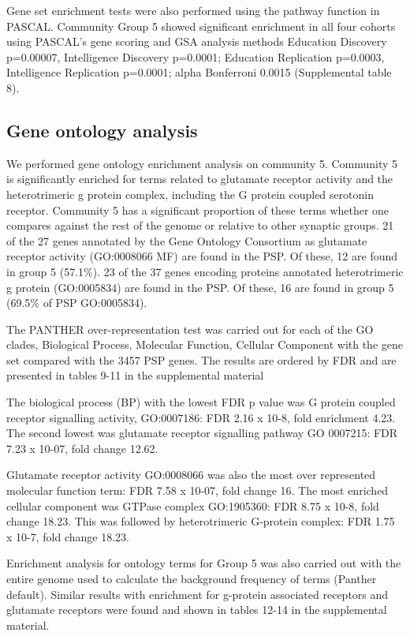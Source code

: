 Gene set enrichment tests were also performed using the pathway function in PASCAL.\cite{lamparter2016fast} Community Group 5 showed significant enrichment in all four cohorts using PASCAL’s gene scoring and GSA analysis methods Education Discovery p=0.00007, Intelligence Discovery p=0.0001; Education Replication p=0.0003, Intelligence Replication p=0.0001; alpha Bonferroni 0.0015 (Supplemental table 8). 

\subsection{Gene ontology analysis}
We performed gene ontology enrichment analysis on community  5. Community 5 is significantly enriched for terms related to glutamate receptor activity and the heterotrimeric g protein complex, including the G protein coupled serotonin receptor. Community 5 has a significant proportion of these terms whether one compares against the rest of the genome or relative to other synaptic groups. 21 of the 27 genes annotated by the Gene Ontology Consortium as
glutamate receptor activity (GO:0008066 MF) are found in the PSP. Of these, 12 are found in group 5 (57.1\%). 
23 of the 37 genes encoding proteins annotated heterotrimeric g protein (GO:0005834) are found in the PSP. Of these, 16 are found in group 5 (69.5\% of PSP GO:0005834). 

The PANTHER over-representation test was carried out for each of the GO clades, Biological Process, Molecular Function, Cellular Component with the gene set compared with the 3457 PSP genes. The results are ordered by FDR and are presented in tables 9-11 in the supplemental material 

The biological process (BP) with the lowest FDR p value was G protein coupled receptor signalling activity, GO:0007186: FDR 2.16 x 10-8, fold enrichment 4.23. The second lowest was glutamate receptor signalling pathway GO 0007215: FDR 7.23 x 10-07, fold change 12.62.

Glutamate receptor activity GO:0008066 was also the most over represented molecular function term: FDR 7.58 x 10-07, fold change 16. The most enriched cellular component was GTPase complex GO:1905360: FDR 8.75 x 10-8, fold change 18.23. This was followed by heterotrimeric G-protein complex: FDR 1.75 x 10-7, fold change 18.23.

Enrichment analysis for ontology terms for Group 5 was also carried out with the entire genome  used to calculate the background frequency of terms (Panther default). Similar results with enrichment for g-protein associated receptors and glutamate receptors were found and shown in tables 12-14 in the supplemental material.

